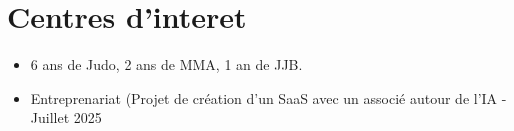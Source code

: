 \documentclass{article}
\begin{document}
\vspace{2ex}
\hrulefill

\section*{Centres d'interet}
\begin{itemize}
  \item 6 ans de Judo, 2 ans de MMA, 1 an de JJB.
  \item Entreprenariat (Projet de création d'un SaaS avec un associé autour de l'IA -  Juillet 2025
\end{itemize}
\end{document}
